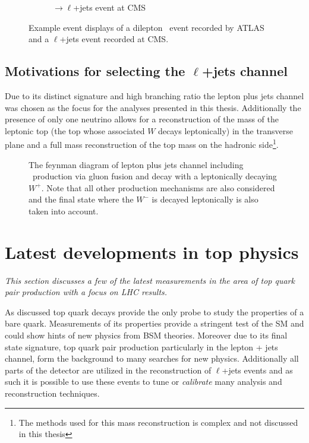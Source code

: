 \begin{figure}[thbp]
\begin{subfigure}[t]{0.30\textheight}
    \caption{\ttbar$\rightarrow\ell$+jets event at CMS} \label{fig:TopQuarkEventDisplayCMS}
  \end{subfigure}%
  \caption{Example event displays of  a dilepton \ttbar\ event recorded by ATLAS and  a $\ell$+jets event recorded at CMS.} \label{fig:TopQuarkEventDisplay}
\end{figure}

\subsection{Motivations for selecting the $\ell$+jets channel}

Due to its distinct signature and high branching ratio the lepton plus jets channel was chosen as the focus for the analyses presented in this thesis. Additionally the presence of only one neutrino allows for a reconstruction of the mass of the leptonic top (the top whose associated $W$ decays leptonically) in the transverse plane and a full mass reconstruction of the top mass on the hadronic side\footnote{The methods used for this mass reconstruction is complex and not discussed in this thesis}.

\begin{figure}[htbp]
  \centering
  \begin{minipage}[][][t]{.60\textwidth}
  
  \end{minipage}
  \caption{The feynman diagram of lepton plus jets channel including \ttbar\ production via gluon fusion and decay with a leptonically decaying $W^+$. Note that all other production mechanisms are also considered and the final state where the $W^-$ is decayed leptonically is also taken into account.} \label{fig:TopQuarkFullLPlusJets}
\end{figure}

\section{Latest developments in top physics}

\textit{This section discusses a few of the latest measurements in the area of top quark pair production with a focus on LHC results.}

As discussed top quark decays provide the only probe to study the properties of a bare quark. Measurements of its properties provide a stringent test of the SM and could show hints of new physics from BSM theories. Moreover due to its final state signature, top quark pair production particularly in the lepton + jets channel, form the background to many searches for new physics. Additionally all parts of the detector are utilized in the reconstruction of $\ell$+jets events and as such it is possible to use these events to tune or \textit{calibrate} many analysis and reconstruction techniques.

